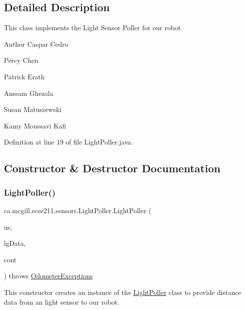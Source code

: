 \subsection{Detailed Description}
This class implements the Light Sensor Poller for our robot

\begin{DoxyAuthor}{Author}
Caspar Cedro 

Percy Chen 

Patrick Erath 

Anssam Ghezala 

Susan Matuszewski 

Kamy Moussavi Kafi 
\end{DoxyAuthor}


Definition at line 19 of file Light\+Poller.\+java.



\subsection{Constructor \& Destructor Documentation}
\mbox{\label{classca_1_1mcgill_1_1ecse211_1_1sensors_1_1_light_poller_aa284d0f6d7e032d3610a7ad428f16132}} 
\subsubsection{\texorpdfstring{Light\+Poller()}{LightPoller()}}
{\footnotesize\ttfamily ca.\+mcgill.\+ecse211.\+sensors.\+Light\+Poller.\+Light\+Poller (\begin{DoxyParamCaption}\item[{Sample\+Provider}]{us,  }\item[{float \mbox{[}$\,$\mbox{]}}]{lg\+Data,  }\item[{\hyperlink{classca_1_1mcgill_1_1ecse211_1_1sensors_1_1_sensor_data}{Sensor\+Data}}]{cont }\end{DoxyParamCaption}) throws \hyperlink{classca_1_1mcgill_1_1ecse211_1_1odometer_1_1_odometer_exceptions}{Odometer\+Exceptions}}

This constructor creates an instance of the \hyperlink{classca_1_1mcgill_1_1ecse211_1_1sensors_1_1_light_poller}{Light\+Poller} class to provide distance data from an light sensor to our robot.


